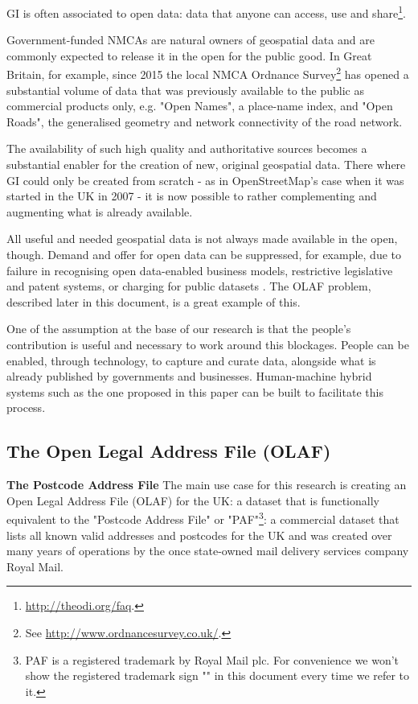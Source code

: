 GI is often associated to open data: data that anyone can access, use and share\footnote{\url{http://theodi.org/faq}.}. 

Government-funded NMCAs are natural owners of geospatial data and are commonly expected to release it in the open for the public good. In Great Britain, for example, since 2015 the local NMCA Ordnance Survey\footnote{See \url{http://www.ordnancesurvey.co.uk/}.} has opened a substantial volume of data that was previously available to the public as commercial products only, e.g. "Open Names", a place-name index, and "Open Roads", the generalised geometry and network connectivity of the road network.
	
The availability of such high quality and authoritative sources becomes a substantial enabler for the creation of new, original geospatial data. There where GI could only be created from scratch - as in OpenStreetMap's case when it was started in the UK in 2007 - it is now possible to rather complementing and augmenting what is already available.

All useful and needed geospatial data is not always made available in the open, though. Demand and offer for open data can be suppressed, for example, due to failure in recognising open data-enabled business models, restrictive legislative and patent systems, or charging for public datasets \cite{shadboltpaf}. The OLAF problem, described later in this document, is a great example of this.
	
One of the assumption at the base of our research is that the people's contribution is useful and necessary to work around this blockages. People can be enabled, through technology, to capture and curate data, alongside what is already published by governments and businesses. Human-machine hybrid systems such as the one proposed in this paper can be built to facilitate this process.

\subsection{The Open Legal Address File (OLAF)}
\label{subs:the-problem-of-creating-an-olaf}

\textbf{The Postcode Address File} The main use case for this research is creating an Open Legal Address File (OLAF) for the UK: a dataset that is functionally equivalent to the "Postcode Address File" or "PAF"\footnote{PAF is a registered trademark by Royal Mail plc. For convenience we won't show the registered trademark sign "\textregistered" in this document every time we refer to it.}: a commercial dataset that lists all known valid addresses and postcodes for the UK and was created over many years of operations by the once state-owned mail delivery services company Royal Mail.

